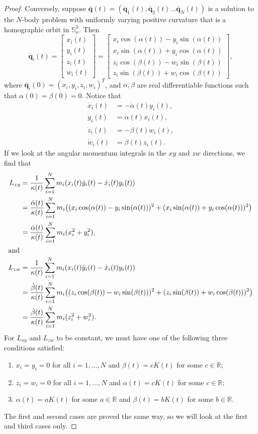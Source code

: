 \documentclass[12pt]{amsart}
\theoremstyle{definition}
\def \mb{\mathbb}
\def \R{\mb R}                 %
\newcommand {\q} {\mathbf{q}}
\begin{document}
{\begin{proof}
Conversely, suppose $\overline{\q}(t)=(\overline{\q}_1(t), \overline{\q}_2(t) \ldots \overline{\q}_N(t))$ is a solution to the $N$-body problem with uniformly varying positive curvature that is a homographic orbit in $\mathbb{S}^3_\kappa$. Then $$\overline{\q}_i(t)=\begin{bmatrix}x_i(t)\\ y_i(t) \\ z_i(t) \\ w_i(t)\end{bmatrix}=\begin{bmatrix}x_i \cos(\alpha(t))-y_i\sin(\alpha(t))\\ x_i\sin(\alpha(t))+y_i\cos(\alpha(t))\\ z_i\cos(\beta(t))-w_i\sin(\beta(t))\\ z_i\sin(\beta(t))+w_i\cos(\beta(t))\end{bmatrix},$$
where $\overline{\q}_i(0)=(x_i, y_i, z_i, w_i)^T$, and $\alpha,\beta$ are real differentiable functions such that $\alpha(0)=\beta(0)=0$. Notice that \begin{align*}
\dot{x}_i(t)&=-\dot{\alpha}(t)y_i(t),\\
\dot{y}_i(t)&=\dot{\alpha}(t)x_i(t),\\
\dot{z}_i(t)&=-\dot{\beta}(t)w_i(t),\\
\dot{w}_i(t)&=\dot{\beta}(t)z_i(t).
\end{align*}
If we look at the angular momentum integrals in the $xy$ and $zw$ directions, we find that 
\begin{align*}
L_{xy}&=\frac{1}{\kappa(t)}\sum\limits_{i=1}^N m_i(x_i(t)\dot{y}_i(t)-\dot{x}_i(t)y_i(t))\\
&=\frac{\dot{\alpha}(t)}{\kappa(t)}\sum\limits_{i=1}^Nm_i \bigl((x_i\cos(\alpha(t))-y_i\sin(\alpha(t)))^2+ (x_i\sin(\alpha(t))+y_i\cos(\alpha(t)))^2\bigr)\\
&=\frac{\dot{\alpha}(t)}{\kappa(t)}\sum\limits_{i=1}^N m_i(x_i^2+y_i^2),\\
\intertext{and}
L_{zw}&= \frac{1}{\kappa(t)}\sum\limits_{i=1}^Nm_i(x_i(t)\dot{y}_i(t)-\dot{x}_i(t)y_i(t))\\
&=\frac{\dot{\beta}(t)}{\kappa(t)}\sum\limits_{i=1}^N m_i\bigl((z_i\cos(\beta(t))-w_i\sin(\beta(t)))^2+(z_i\sin(\beta(t))+w_i\cos(\beta(t)))^2\bigr)\\
&=\frac{\dot{\beta}(t)}{\kappa(t)}\sum\limits_{i=1}^Nm_i(z_i^2+w_i^2).\end{align*}
For $L_{xy}$ and $L_{zw}$ to be constant, we must have one of the following three conditions satisfied:
\begin{enumerate}
\item $x_i=y_i=0$ for all $i=1,\ldots, N$ and $\beta(t)=cK(t)$ for some $c \in \R$;
\item $z_i=w_i=0$ for all $i=1,\ldots, N$ and $\alpha(t)=cK(t)$ for some $c \in \R$;
\item $\alpha(t)=aK(t)$ for some $a \in \R$ and $\beta(t)=bK(t)$ for some $b \in \R$.
\end{enumerate}
The first and second cases are proved the same way, so we will look at the first and third cases only. 



\end{proof}}
\end{document}
